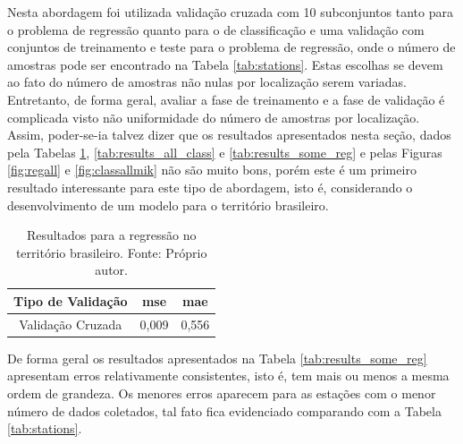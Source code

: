 Nesta abordagem foi utilizada validação cruzada com 10 subconjuntos tanto para o problema de regressão quanto para o de classificação e uma validação com conjuntos de treinamento e teste para o problema de regressão, onde o número de amostras pode ser encontrado na Tabela \ref{tab:stations}. Estas escolhas se devem ao fato do número de amostras não nulas por localização serem variadas. Entretanto, de forma geral, avaliar a fase de treinamento e a fase de validação é complicada visto não uniformidade do número de amostras por localização. Assim, poder-se-ia talvez dizer que os resultados apresentados nesta seção, dados pela Tabelas \ref{tab:results_all_reg}, \ref{tab:results_all_class} e \ref{tab:results_some_reg} e pelas Figuras \ref{fig:regall} e \ref{fig:classallmik} não são muito bons, porém este é um primeiro resultado interessante para este tipo de abordagem, isto é, considerando o desenvolvimento de um modelo para o território brasileiro.

\begin{table}[H]
\begin{center}
\begin{tabular}{|c|c|c|}
\hline
Tipo de Validação & mse       & mae   \\ \hline
Validação Cruzada                   & 0,009   & 0,556  \\ \hline
\end{tabular}
\end{center}
\vspace{12pt}
\caption{Resultados para a regressão no território brasileiro. Fonte: Próprio autor.}
\label{tab:results_all_reg}
\end{table}

De forma geral os resultados apresentados na Tabela \ref{tab:results_some_reg} apresentam erros relativamente consistentes, isto é, tem mais ou menos a mesma ordem de grandeza. Os menores erros aparecem para as estações com o menor número de dados coletados, tal fato fica evidenciado comparando com a Tabela \ref{tab:stations}.

